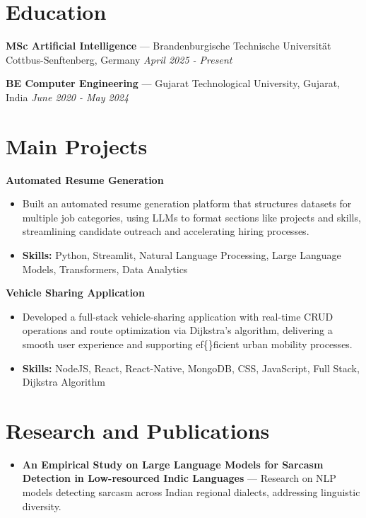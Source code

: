 \documentclass[a4paper,10pt]{article}
\begin{document}
\section*{Education}
\textbf{MSc Artificial Intelligence} — Brandenburgische Technische Universität Cottbus-Senftenberg, Germany \hfill \textit{April 2025 - Present}\par
\vspace{1.5pt}
\textbf{BE Computer Engineering} — Gujarat Technological University, Gujarat, India \hfill \textit{June 2020 - May 2024}\par

\section*{Main Projects}
\textbf{Automated Resume Generation}\par
\vspace{1pt}
\begin{itemize}
  \item Built an automated resume generation platform that structures datasets for multiple job categories, using LLMs to format sections like projects and skills, streamlining candidate outreach and accelerating hiring processes.
  \item \textbf{Skills:} Python, Streamlit, Natural Language Processing, Large Language Models, Transformers, Data Analytics
\end{itemize}
\vspace{3pt}
\textbf{Vehicle Sharing Application}\par
\vspace{1pt}
\begin{itemize}
  \item Developed a full-stack vehicle-sharing application with real-time CRUD operations and route optimization via Dijkstra's algorithm, delivering a smooth user experience and supporting ef\{\}ficient urban mobility processes.
  \item \textbf{Skills:} NodeJS, React, React-Native, MongoDB, CSS, JavaScript, Full Stack, Dijkstra Algorithm
\end{itemize}

\section*{Research and Publications}
\begin{itemize}
\item \textbf{An Empirical Study on Large Language Models for Sarcasm Detection in Low-resourced Indic Languages} — Research on NLP models detecting sarcasm across Indian regional dialects, addressing linguistic diversity.
\end{itemize}
\end{document}
